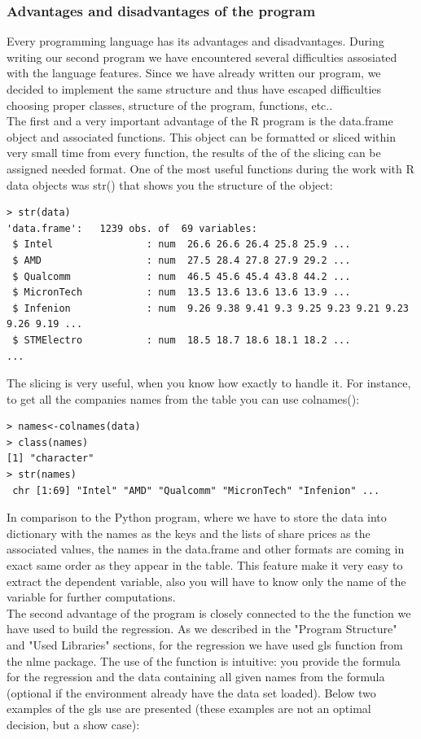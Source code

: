 \documentclass{article}
\begin{document}
\subsubsection{Advantages and disadvantages of the program}
Every programming language has its advantages and disadvantages. During writing our second program we have encountered several difficulties assosiated with the language features. Since we have already written our program, we decided to implement the same structure and thus have escaped difficulties choosing proper classes, structure of the program, functions, etc..\\
The first and a very important advantage of the R program is the data.frame object and associated functions. This object can be formatted or sliced within very small time from every function, the results of the of the slicing can be assigned needed format. One of the most useful functions during the work with R data objects was str() that shows you the structure of the object:
\begin{verbatim}
> str(data)
'data.frame':   1239 obs. of  69 variables:
 $ Intel                : num  26.6 26.6 26.4 25.8 25.9 ...
 $ AMD                  : num  27.5 28.4 27.8 27.9 29.2 ...
 $ Qualcomm             : num  46.5 45.6 45.4 43.8 44.2 ...
 $ MicronTech           : num  13.5 13.6 13.6 13.6 13.9 ...
 $ Infenion             : num  9.26 9.38 9.41 9.3 9.25 9.23 9.21 9.23 9.26 9.19 ...
 $ STMElectro           : num  18.5 18.7 18.6 18.1 18.2 ...
...
\end{verbatim}
The slicing is very useful, when you know how exactly to handle it. For instance, to get all the companies names from the table you can use colnames():
\begin{verbatim}
> names<-colnames(data)
> class(names)
[1] "character"
> str(names)
 chr [1:69] "Intel" "AMD" "Qualcomm" "MicronTech" "Infenion" ...
\end{verbatim} 
In comparison to the Python program, where we have to store the data into dictionary with the names as the keys and the lists of share prices as the associated values, the names in the data.frame and other formats are coming in exact same order as they appear in the table. This feature make it very easy to extract the dependent variable, also you will have to know only the name of the variable for further computations.\\
The second advantage of the program is closely connected to the the function we have used to build the regression. As we described in the "Program Structure" and "Used Libraries" sections, for the regression we have used gls function from the nlme package. The use of the function is intuitive: you provide the formula for the regression and the data containing all given names from the formula (optional if the environment already have the data set loaded). Below two examples of the gls use are presented (these examples are not an optimal decision, but a show case):
\end{document}
